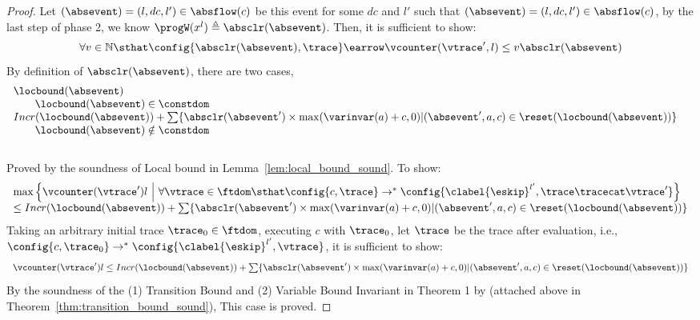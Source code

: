 \begin{proof}
  
  Let $(\absevent) = (l, dc, l') \in \absflow(c)$ be this event for some $dc$ and $l'$ such that  $(\absevent) = (l, dc, l') \in \absflow(c)$,
  by the last step of phase 2, we know
  $
  \progW(x^l) 
  \triangleq \absclr(\absevent)
  $.
   Then, it is sufficient to show:
  \[
  \forall v \in \mathbb{N} \sthat  
  \config{\absclr(\absevent), \trace} \earrow 
  \vcounter(\vtrace', l) \leq v
  \absclr(\absevent)
  \]
  By definition of $\absclr(\absevent)$, there are two cases,
  \[
 \begin{array}{ll}
  \locbound(\absevent) & \\
  \qquad \locbound(\absevent) \in \constdom \\
  Incr(\locbound(\absevent)) + 
  \sum\{\absclr(\absevent') \times \max(\varinvar(a) + c, 0) | (\absevent', a, c) \in \reset(\locbound(\absevent))\} 
  & \\
  \qquad \locbound(\absevent) \notin \constdom
\end{array}
\]
  \caseL{$\locbound(\absevent) \in \constdom$}
  \\
  Proved by the soundness of Local bound in Lemma~\ref{lem:local_bound_sound}.
  \caseL{$\locbound(\absevent) \notin \constdom$}
To show:
\[
  \begin{array}{l}
    \max \left\{ \vcounter(\vtrace') l ~ \middle\vert~
\forall \vtrace \in \ftdom \sthat  \config{{c}, \trace} \to^{*} \config{\clabel{\eskip}^{l'}, \trace\tracecat\vtrace'} \right\} 
\\
\leq 
Incr(\locbound(\absevent)) + 
\sum\{\absclr(\absevent') \times \max(\varinvar(a) + c, 0) | (\absevent', a, c) \in \reset(\locbound(\absevent))\} 
\end{array}
\]
  Taking an arbitrary initial trace
  $\trace_0 \in \ftdom$, 
  executing $c$ with $\trace_0$, let $\trace$ be the trace after evaluation, i.e., $\config{{c}, \trace_0} \to^{*} \config{\clabel{\eskip}^{l'},\vtrace}$, it is sufficient to show:
  \[ 
    \begin{array}{l}
      \vcounter(\vtrace') l \leq 
    Incr(\locbound(\absevent)) + 
    \sum\{\absclr(\absevent') \times \max(\varinvar(a) + c, 0) | (\absevent', a, c) \in \reset(\locbound(\absevent))\}
  \end{array}
  \]
%
 By the soundness of the (1) Transition Bound and (2) Variable Bound Invariant 
 in Theorem 1 by \cite{SinnZV17} (attached above in Theorem~\ref{thm:transition_bound_sound}), 
This case is proved.
\end{proof}

